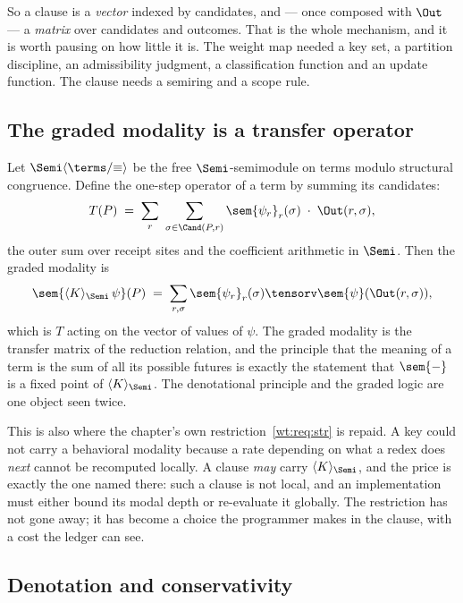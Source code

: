 So a clause is a \emph{vector} indexed by candidates, and --- once composed with
$\Out$ --- a \emph{matrix} over candidates and outcomes. That is the whole mechanism,
and it is worth pausing on how little it is. The weight map needed a key set, a partition
discipline, an admissibility judgment, a classification function and an update function.
The clause needs a semiring and a scope rule.

\subsection{The graded modality is a transfer operator}
\label{gw:sec:modality}

Let $\Semi\langle \terms/{\equiv}\rangle$ be the free $\Semi$-semimodule on terms modulo
structural congruence. Define the one-step operator of a term by summing its candidates:
\begin{equation}
\label{gw:eq:onestep}
  T(P) \;=\; \sum_{r}\ \sum_{\sigma \in \Cand(P,r)}
    \sem{\psi_r}_r(\sigma)\;\cdot\;\Out(r,\sigma) ,
\end{equation}
the outer sum over receipt sites and the coefficient arithmetic in $\Semi$. Then the
graded modality is
\[
  \sem{\langle K \rangle_{\Semi}\,\psi}(P)
  \;=\; \sum_{r,\sigma} \sem{\psi_r}_r(\sigma) \tensorv \sem{\psi}(\Out(r,\sigma)),
\]
which is $T$ acting on the vector of values of $\psi$. The graded modality is the
transfer matrix of the reduction relation, and the principle that the meaning of a term
is the sum of all its possible futures is exactly the statement that $\sem{-}$ is a fixed
point of $\langle K\rangle_{\Semi}$. The denotational principle and the graded logic are
one object seen twice.

This is also where the chapter's own restriction~\ref{wt:req:str} is repaid. A key could
not carry a behavioral modality because a rate depending on what a redex does \emph{next}
cannot be recomputed locally. A clause \emph{may} carry $\langle K\rangle_{\Semi}$, and
the price is exactly the one named there: such a clause is not local, and an
implementation must either bound its modal depth or re-evaluate it globally. The
restriction has not gone away; it has become a choice the programmer makes in the clause,
with a cost the ledger can see.

\subsection{Denotation and conservativity}

